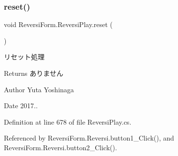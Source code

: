 \subsubsection{\texorpdfstring{reset()}{reset()}}
{\footnotesize\ttfamily void Reversi\+Form.\+Reversi\+Play.\+reset (\begin{DoxyParamCaption}{ }\end{DoxyParamCaption})}



リセット処理 

\begin{DoxyReturn}{Returns}
ありません 
\end{DoxyReturn}
\begin{DoxyAuthor}{Author}
Yuta Yoshinaga 
\end{DoxyAuthor}
\begin{DoxyDate}{Date}
2017.. 
\end{DoxyDate}


Definition at line 678 of file Reversi\+Play.\+cs.



Referenced by Reversi\+Form.\+Reversi.\+button1\+\_\+\+Click(), and Reversi\+Form.\+Reversi.\+button2\+\_\+\+Click().

